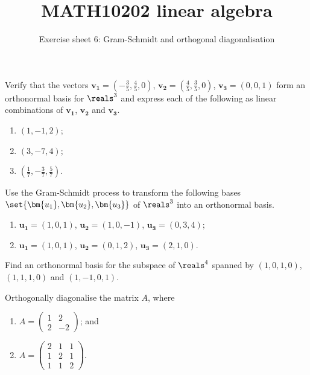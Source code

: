 \documentclass[english,12pt,a4paper]{scrartcl}
\title{MATH10202 linear algebra}
\subtitle{Exercise sheet 6: Gram-Schmidt and orthogonal diagonalisation}
\author{}
\date{\vspace{-5ex}}
\renewcommand{\vec}[1]{\bm{#1}}
\newenvironment{modenumerate}
  {\enumerate\setupmodenumerate}
  {\endenumerate}
\newif\ifmoditem
\newcommand{\setupmodenumerate}{%
  \global\moditemfalse
  \let\origmakelabel\makelabel
  \def\moditem##1{\global\moditemtrue\def\mesymbol{##1}\item}%
  \def\makelabel##1{%
  \origmakelabel{##1\ifmoditem\rlap{\mesymbol}\fi\enspace}%
\global\moditemfalse}%
}
\begin{document}
\maketitle

\begin{modenumerate}
  \moditem{*} Verify that the vectors $\vec{v_1} = (-\frac{3}{5}, \frac{4}{5}, 
  0)$, $\vec{v_2} = (\frac{4}{5}, \frac{3}{5}, 0)$, $\vec{v_3} = (0, 0, 1)$ 
  form an orthonormal basis for $\reals^3$ and express each of the following as 
  linear combinations of $\vec{v_1}$, $\vec{v_2}$ and $\vec{v_3}$.
  \begin{multicols}{3}
    \begin{enumerate}
      \item $(1, -1, 2)$;
      \item $(3, -7, 4)$;
      \item $(\frac{1}{7}, -\frac{3}{7}, \frac{5}{7})$.
    \end{enumerate}
  \end{multicols}
  \moditem{*} Use the Gram-Schmidt process to transform the following bases 
  $\set{\vec{u_1}, \vec{u_2}, \vec{u_3}}$ of $\reals^3$ into an orthonormal 
  basis.
  \begin{enumerate}
    \item $\vec{u_1} = (1, 0, 1)$, $\vec{u_2} = (1, 0, -1)$, $\vec{u_3} = (0, 
      3, 4)$;
    \item $\vec{u_1} = (1, 0, 1)$, $\vec{u_2} = (0, 1, 2)$, $\vec{u_3} = (2, 1, 
      0)$.
  \end{enumerate}
  \item Find an orthonormal basis for the subspace of $\reals^4$ spanned by 
    $(1, 0, 1, 0)$, $(1, 1, 1, 0)$ and $(1, -1, 0, 1)$.
  \moditem{*} Orthogonally diagonalise the matrix $A$, where
  \begin{enumerate}
    \item $A =
      \begin{pmatrix}
        1 & 2 \\
        2 & -2
      \end{pmatrix}
      $; and
    \item $A =
      \begin{pmatrix}
        2 & 1 & 1 \\
        1 & 2 & 1 \\
        1 & 1 & 2
      \end{pmatrix}
      $.
  \end{enumerate}
\end{modenumerate}
\end{document}
